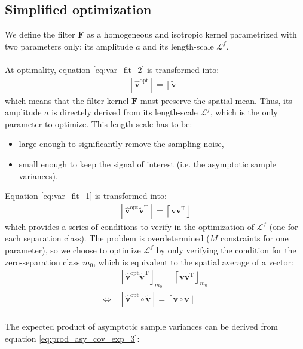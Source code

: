 \documentclass[12pt]{scrartcl}
\begin{document}
\subsection{Simplified optimization}
We define the filter $\mathbf{F}$ as a homogeneous and isotropic kernel parametrized with two parameters only: its amplitude $a$ and its length-scale $\mathcal{L}^f$.\\
$  $\\
At optimality, equation \eqref{eq:var_flt_2} is transformed into:
\begin{align}
\label{eq:mean_preserving}
\left\lceil\widehat{\mathbf{v}}^\mathrm{opt}\right\rfloor = \left\lceil\widetilde{\mathbf{v}}\right\rfloor
\end{align}
which means that the filter kernel $\mathbf{F}$ must preserve the spatial mean. Thus, its amplitude $a$ is directely derived from its length-scale $\mathcal{L}^f$, which is the only parameter to optimize. This length-scale has to be:
\begin{itemize}
\item large enough to significantly remove the sampling noise,
\item small enough to keep the signal of interest (i.e. the asymptotic sample variances).
\end{itemize}
Equation \eqref{eq:var_flt_1} is transformed into:
\begin{align}
\left\lceil \widehat{\mathbf{v}}^\mathrm{opt} \widetilde{\mathbf{v}}^\mathrm{T} \right\rfloor = \left\lceil \mathbf{v} \mathbf{v}^\mathrm{T} \right\rfloor
\end{align}
which provides a series of conditions to verify in the optimization of $\mathcal{L}^f$ (one for each separation class). The problem is overdetermined ($M$ constraints for one parameter), so we choose to optimize $\mathcal{L}^f$ by only verifying the condition for the zero-separation class $m_0$, which is equivalent to the spatial average of a vector:
\begin{align}
\label{eq:var_filt}
& \left\lceil \widehat{\mathbf{v}}^\mathrm{opt} \widetilde{\mathbf{v}}^\mathrm{T} \right\rfloor_{m_0} = \left\lceil \mathbf{v} \mathbf{v}^\mathrm{T} \right\rfloor_{m_0}  \nonumber \\
\Leftrightarrow \ & \left\lceil \widehat{\mathbf{v}}^\mathrm{opt} \circ \widetilde{\mathbf{v}} \right\rfloor = \left\lceil \mathbf{v} \circ \mathbf{v} \right\rfloor
\end{align}
$  $\\
The expected product of asymptotic sample variances can be derived from equation \eqref{eq:prod_asy_cov_exp_3}:
\end{document}
